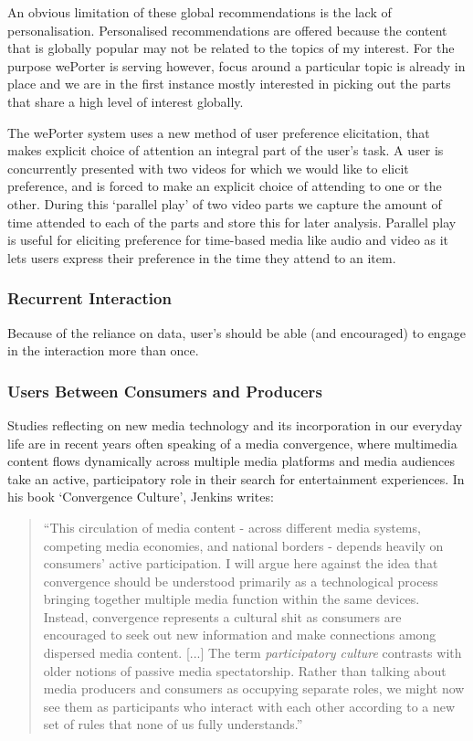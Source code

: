An obvious limitation of these global recommendations is the lack of personalisation. Personalised recommendations are offered because the content that is globally popular may not be related to the topics of my interest. For the purpose wePorter is serving however, focus around a particular topic is already in place and we are in the first instance mostly interested in picking out the parts that share a high level of interest globally.

The wePorter system uses a new method of user preference elicitation, that makes explicit choice of attention an integral part of the user's task. A user is concurrently presented with two videos for which we would like to elicit preference, and is forced to make an explicit choice of attending to one or the other. During this `parallel play' of two video parts we capture the amount of time attended to each of the parts and store this for later analysis. Parallel play is useful for eliciting preference for time-based media like audio and video as it lets users express their preference in the time they attend to an item.

\subsubsection{Recurrent Interaction}
Because of the reliance on data, user's should be able (and encouraged) to engage in the interaction more than once.

\subsubsection{Users Between Consumers and Producers}
Studies reflecting on new media technology and its incorporation in our everyday life are in recent years often speaking of a media convergence, where multimedia content flows dynamically across multiple media platforms and media audiences take an active, participatory role in their search for entertainment experiences. In his book `Convergence Culture', Jenkins writes:

\begin{quote}
  ``This circulation of media content - across different media systems, competing media economies, and national borders - depends heavily on consumers' active participation. I will argue here against the idea that convergence should be understood primarily as a technological process bringing together multiple media function within the same devices. Instead, convergence represents a cultural shit as consumers are encouraged to seek out new information and make connections among dispersed media content. [...] The term \emph{participatory culture} contrasts with older notions of passive media spectatorship. Rather than talking about media producers and consumers as occupying separate roles, we might now see them as participants who interact with each other according to a new set of rules that none of us fully understands.''\cite{jenkins2006convergence}
\end{quote}

